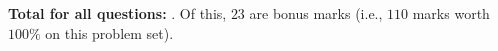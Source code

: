\documentclass{article}
\DeclareMathOperator*{\1}{\mathbbm{1}}
\newcounter{DocPoints} %
\newcounter{QuestionPoints} %
\newcommand{\tpoints}[1]{        %
	\ifthenelse{\isempty{#1}}%
	{%
	}%
	{%
		\addtocounter{DocPoints}{#1}
		\addtocounter{QuestionPoints}{#1}
	}													 %
	\par\mbox{}\par\noindent\hfill {Total: \bf \arabic{QuestionPoints}\xspace points}\par\mbox{}\par\hrule\hrule
	\setcounter{QuestionPoints}{0}
}
\theoremstyle{definition}
\newtheorem{question}{Question}
\theoremstyle{remark}
\newtheorem*{solution*}{Solution}
\begin{document}
%
%
%
%
%
%
%
%
%
%
%


\bigskip
\bigskip

\noindent
\textbf{
\noindent
Total for all questions: }.
Of this, $23$ are bonus marks (i.e., $110$ marks worth $100\%$ on this problem set).
\end{document}
